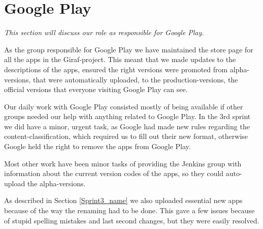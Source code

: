 \section{Google Play} \label{Roles_SecGooglePlay}
\textit{This section will discuss our role as responsible for Google Play.}

As the group responsible for Google Play we have maintained the store page for all the apps in the Giraf-project. This meant that we made updates to the descriptions of the apps, ensured the right versions were promoted from alpha-versions, that were automatically uploaded, to the production-versions, the official versions that everyone visiting Google Play can see.

Our daily work with Google Play consisted mostly of being available if other groups needed our help with anything related to Google Play. In the 3rd sprint we did have a minor, urgent task, as Google had made new rules regarding the content-classification, which required us to fill out their new format, otherwise Google held the right to remove the apps from Google Play.

Most other work have been minor tasks of providing the Jenkins group with information about the current version codes of the apps, so they could auto-upload the alpha-versions.

As described in Section \ref{Sprint3_name} we also uploaded essential new apps because of the way the renaming had to be done. This gave a few issues because of stupid spelling mistakes and last second changes, but they were easily resolved.
